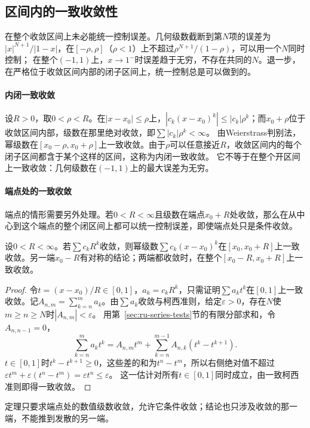 \subsection{区间内的一致收敛性}
\label{sec:ru-power-series-uniform}

在整个收敛区间上未必能统一控制误差。几何级数截断到第$N$项的误差为$|x|^{N+1}/|1-x|$，在$[-\rho,\rho]$（$\rho<1$）上不超过$\rho^{N+1}/(1-\rho)$，可以用一个$N$同时控制；
在整个$(-1,1)$上，$x\to1^-$时误差趋于无穷，不存在共同的$N$。退一步，在严格位于收敛区间内部的闭子区间上，统一控制总是可以做到的。

\paragraph{内闭一致收敛}
设$R>0$，取$0<\rho<R$。在$|x-x_0|\leq\rho$上，$|c_k(x-x_0)^k|\leq|c_k|\rho^k$；而$x_0+\rho$位于收敛区间内部，级数在那里绝对收敛，即$\sum|c_k|\rho^k<\infty$。
由Weierstrass判别法，幂级数在$[x_0-\rho,x_0+\rho]$上一致收敛。由于$\rho$可以任意接近$R$，收敛区间内的每个闭子区间都含于某个这样的区间，这称为内闭一致收敛。
它不等于在整个开区间上一致收敛：几何级数在$(-1,1)$上的最大误差为无穷。

\paragraph{端点处的一致收敛}
端点的情形需要另外处理。若$0<R<\infty$且级数在端点$x_0+R$处收敛，那么在从中心到这个端点的整个闭区间上都可以统一控制误差，即使端点处只是条件收敛。
\begin{theorem}[Abel第二定理]
\label{thm:ru-abel-endpoint}
设$0<R<\infty$。若$\sum c_kR^k$收敛，则幂级数$\sum c_k(x-x_0)^k$在$[x_0,x_0+R]$上一致收敛。另一端$x_0-R$有对称的结论；两端都收敛时，在整个$[x_0-R,x_0+R]$上一致收敛。
\end{theorem}
\begin{proof}
令$t=(x-x_0)/R\in[0,1]$，$a_k=c_kR^k$，只需证明$\sum a_kt^k$在$[0,1]$上一致收敛。记$A_{n,m}=\sum_{k=n}^ma_k$。由$\sum a_k$收敛与柯西准则，给定$\varepsilon>0$，存在$N$使$m\geq n\geq N$时$|A_{n,m}|<\varepsilon$。
用第~\ref{sec:ru-series-tests}节的有限分部求和，令$A_{n,n-1}=0$，
\[
 \sum_{k=n}^ma_kt^k=A_{n,m}t^m+\sum_{k=n}^{m-1}A_{n,k}(t^k-t^{k+1}).
\]
$t\in[0,1]$时$t^k-t^{k+1}\geq0$，这些差的和为$t^n-t^m$，所以右侧绝对值不超过$\varepsilon t^m+\varepsilon(t^n-t^m)=\varepsilon t^n\leq\varepsilon$。
这一估计对所有$t\in[0,1]$同时成立，由一致柯西准则即得一致收敛。
\end{proof}
定理只要求端点处的数值级数收敛，允许它条件收敛；结论也只涉及收敛的那一端，不能推到发散的另一端。

